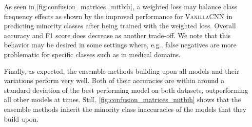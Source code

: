 As seen in \autoref{fig:confusion_matrices_mitbih}, a weighted loss may balance class frequency effects as shown by the improved performance for \textsc{VanillaCNN} in predicting minority classes after being trained with the weighted loss. Overall accuracy and F1 score does decrease as another trade-off. We note that this behavior may be desired in some settings where, e.g., false negatives are more problematic for specific classes such as in medical domains.

Finally, as expected, the ensemble methods building upon all models and their variations perform very well. Both of their accuracies are within around a standard deviation of the best performing model on both datasets, outperforming all other models at times. Still, \autoref{fig:confusion_matrices_mitbih} shows that the ensemble methods inherit the minority class inaccuracies of the models that they build upon.
